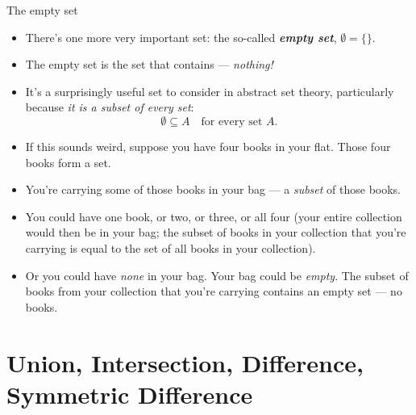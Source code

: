 \documentclass[11pt,aspectratio=1610]{beamer}
\begin{document}
\begin{frame}{The empty set}
	\begin{itemize} \p
		\item There's one more very important set: the so-called \emph{\textbf{empty set}}, $\emptyset = \{\}$. \p
		\item The empty set is the set that contains --- \textit{nothing!} \p
		\item It's a surprisingly useful set to consider in abstract set theory, particularly because \emph{it is a subset of every set}:
		\[
		\emptyset \subseteq A \quad \textrm{for every set } A. 
		\] \p
		\item If this sounds weird, suppose you have four books in your flat. Those four books form a set. \p
		\item You're carrying some of those books in your bag --- a \emph{subset} of those books. \p
		\item You could have one book, or two, or three, or all four (your entire collection would then be in your bag; the subset of books in your collection that you're carrying is equal to the set of all books in your collection).\p
		\item Or you could have \textit{none} in your bag. Your bag could be \textit{empty}. The subset of books from your collection that you're carrying contains an empty set --- no books. 
	\end{itemize}
\end{frame}

\section{Union, Intersection, Difference, Symmetric Difference}
\end{document}
